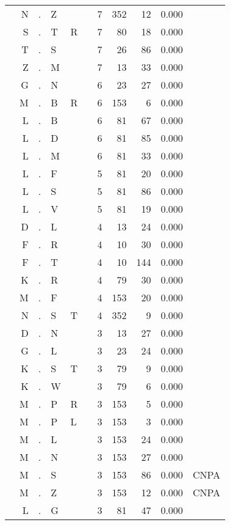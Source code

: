 \begin{longtable}{r@{ } r@{ } c@{ } l@{ } l@{ } l@{ } r r r r l }
  & N & . & Z &   &   & 7 & 352 & 12 & 0.000 &  \\
  & S & . & T & R &   & 7 & 80 & 18 & 0.000 &  \\
  & T & . & S &   &   & 7 & 26 & 86 & 0.000 &  \\
  & Z & . & M &   &   & 7 & 13 & 33 & 0.000 &  \\
  & G & . & N &   &   & 6 & 23 & 27 & 0.000 &  \\
  & M & . & B & R &   & 6 & 153 & 6 & 0.000 &  \\
  & L & . & B &   &   & 6 & 81 & 67 & 0.000 &  \\
  & L & . & D &   &   & 6 & 81 & 85 & 0.000 &  \\
  & L & . & M &   &   & 6 & 81 & 33 & 0.000 &  \\
  & L & . & F &   &   & 5 & 81 & 20 & 0.000 &  \\
  & L & . & S &   &   & 5 & 81 & 86 & 0.000 &  \\
  & L & . & V &   &   & 5 & 81 & 19 & 0.000 &  \\
  & D & . & L &   &   & 4 & 13 & 24 & 0.000 &  \\
  & F & . & R &   &   & 4 & 10 & 30 & 0.000 &  \\
  & F & . & T &   &   & 4 & 10 & 144 & 0.000 &  \\
  & K & . & R &   &   & 4 & 79 & 30 & 0.000 &  \\
  & M & . & F &   &   & 4 & 153 & 20 & 0.000 &  \\
  & N & . & S & T &   & 4 & 352 & 9 & 0.000 &  \\
  & D & . & N &   &   & 3 & 13 & 27 & 0.000 &  \\
  & G & . & L &   &   & 3 & 23 & 24 & 0.000 &  \\
  & K & . & S & T &   & 3 & 79 & 9 & 0.000 &  \\
  & K & . & W &   &   & 3 & 79 & 6 & 0.000 &  \\
  & M & . & P & R &   & 3 & 153 & 5 & 0.000 &  \\
  & M & . & P & L &   & 3 & 153 & 3 & 0.000 &  \\
  & M & . & L &   &   & 3 & 153 & 24 & 0.000 &  \\
  & M & . & N &   &   & 3 & 153 & 27 & 0.000 &  \\
  & M & . & S &   &   & 3 & 153 & 86 & 0.000 & \textsc{CNPA} \\
  & M & . & Z &   &   & 3 & 153 & 12 & 0.000 & \textsc{CNPA} \\
  & L & . & G &   &   & 3 & 81 & 47 & 0.000 &  \\

\end{longtable}
